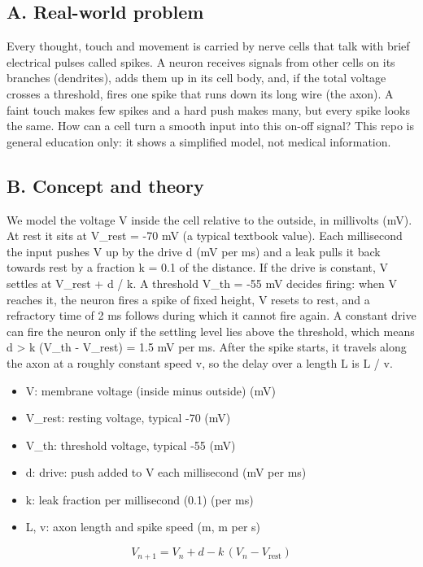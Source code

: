 \documentclass[11pt,a4paper]{article}
\begin{document}
\subsection*{A. Real-world problem}
Every thought, touch and movement is carried by nerve cells that talk with brief electrical pulses called spikes. A neuron receives signals from other cells on its branches (dendrites), adds them up in its cell body, and, if the total voltage crosses a threshold, fires one spike that runs down its long wire (the axon). A faint touch makes few spikes and a hard push makes many, but every spike looks the same. How can a cell turn a smooth input into this on-off signal? This repo is general education only: it shows a simplified model, not medical information.

\subsection*{B. Concept and theory}
We model the voltage V inside the cell relative to the outside, in millivolts (mV). At rest it sits at V\_rest = -70 mV (a typical textbook value). Each millisecond the input pushes V up by the drive d (mV per ms) and a leak pulls it back towards rest by a fraction k = 0.1 of the distance. If the drive is constant, V settles at V\_rest + d / k. A threshold V\_th = -55 mV decides firing: when V reaches it, the neuron fires a spike of fixed height, V resets to rest, and a refractory time of 2 ms follows during which it cannot fire again. A constant drive can fire the neuron only if the settling level lies above the threshold, which means d \textgreater{} k (V\_th - V\_rest) = 1.5 mV per ms. After the spike starts, it travels along the axon at a roughly constant speed v, so the delay over a length L is L / v.

\begin{itemize}[nosep]
\item V: membrane voltage (inside minus outside) (mV)
\item V\_rest: resting voltage, typical -70 (mV)
\item V\_th: threshold voltage, typical -55 (mV)
\item d: drive: push added to V each millisecond (mV per ms)
\item k: leak fraction per millisecond (0.1) (per ms)
\item L, v: axon length and spike speed (m, m per s)
\end{itemize}

\begin{equation*}
V_{n+1}=V_n+d-k\,(V_n-V_{\mathrm{rest}})
\end{equation*}
\end{document}

